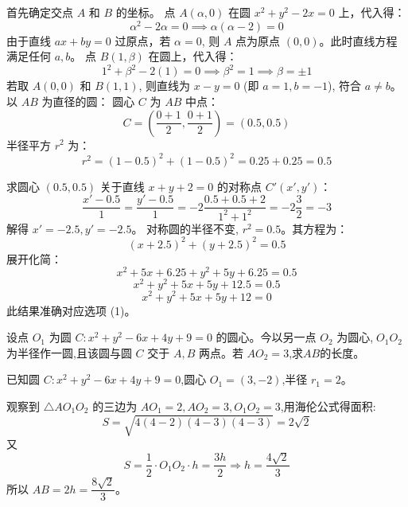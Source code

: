 \begin{questions}
\begin{solution}
首先确定交点 $A$ 和 $B$ 的坐标。
点 $A(\alpha, 0)$ 在圆 $x^2 + y^2 - 2x = 0$ 上，代入得：
\[
\alpha^2 - 2\alpha = 0 \implies \alpha(\alpha - 2) = 0
\]
由于直线 $ax + by = 0$ 过原点，若 $\alpha = 0$, 则 $A$ 点为原点 $(0,0)$。此时直线方程满足任何 $a, b$。
点 $B(1, \beta)$ 在圆上，代入得：
\[
1^2 + \beta^2 - 2(1) = 0 \implies \beta^2 = 1 \implies \beta = \pm 1
\]
若取 $A(0, 0)$ 和 $B(1, 1)$, 则直线为 $x - y = 0$ (即 $a=1, b=-1$), 符合 $a \neq b$。
以 $AB$ 为直径的圆：
圆心 $C$ 为 $AB$ 中点：
\[
C = \left( \frac{0 + 1}{2}, \frac{0 + 1}{2} \right) = (0.5, 0.5)
\]
半径平方 $r^2$ 为：
\[
r^2 = (1 - 0.5)^2 + (1 - 0.5)^2 = 0.25 + 0.25 = 0.5
\]

求圆心 $(0.5, 0.5)$ 关于直线 $x + y + 2 = 0$ 的对称点 $C'(x', y')$：
\[
\frac{x' - 0.5}{1} = \frac{y' - 0.5}{1} = -2 \frac{0.5 + 0.5 + 2}{1^2 + 1^2} = -2 \frac{3}{2} = -3
\]
解得 $x' = -2.5, y' = -2.5$。
对称圆的半径不变, $r^2 = 0.5$。其方程为：
\[
(x + 2.5)^2 + (y + 2.5)^2 = 0.5
\]
展开化简：
\[
x^2 + 5x + 6.25 + y^2 + 5y + 6.25 = 0.5
\]
\[
x^2 + y^2 + 5x + 5y + 12.5 = 0.5
\]
\[
x^2 + y^2 + 5x + 5y + 12 = 0
\]
此结果准确对应选项 (1)。
\end{solution}

    \question 设点 \(O_1\) 为圆 \(C: x^2 + y^2 - 6x + 4y + 9 = 0\) 的圆心。今以另一点 \(O_2\) 为圆心,\(\;O_1O_2\) 为半径作一圆,且该圆与圆 \(C\) 交于 \(A,B\) 两点。若 \(AO_2 = 3\),求$AB$的长度。 
    \begin{solution}
        已知圆 \(C: x^2 + y^2 - 6x + 4y + 9 = 0\),圆心 \(O_1 = (3, -2)\),半径 \(r_1 = 2\)。

        观察到 \(\triangle AO_1O_2\) 的三边为 \(AO_1 = 2, AO_2 = 3, O_1O_2 = 3\),用海伦公式得面积:
        \[
        S = \sqrt{4(4 - 2)(4 - 3)(4 - 3)} = 2\sqrt{2}
        \]
        又
        \[
        S = \frac{1}{2} \cdot O_1O_2 \cdot h = \frac{3h}{2} \Rightarrow h = \frac{4\sqrt{2}}{3}
        \]
        所以 \(AB = 2h = \dfrac{8\sqrt{2}}{3}\)。
    \end{solution}


\end{questions}
